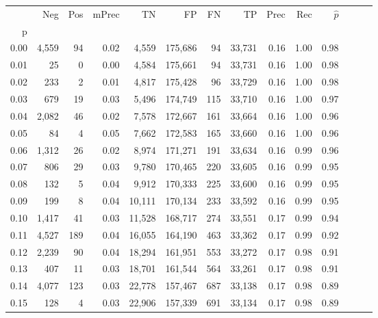 \begin{tabular}{rrrrrrrrrrrrrr}
\toprule
{} &     Neg &    Pos & mPrec &       TN &       FP &      FN &      TP &  Prec &   Rec & $\hat{p}$ \\
p    &         &        &       &          &          &         &         &       &       &           \\
\midrule
0.00 &   4,559 &     94 &  0.02 &    4,559 &  175,686 &      94 &  33,731 &  0.16 &  1.00 &      0.98 \\
0.01 &      25 &      0 &  0.00 &    4,584 &  175,661 &      94 &  33,731 &  0.16 &  1.00 &      0.98 \\
0.02 &     233 &      2 &  0.01 &    4,817 &  175,428 &      96 &  33,729 &  0.16 &  1.00 &      0.98 \\
0.03 &     679 &     19 &  0.03 &    5,496 &  174,749 &     115 &  33,710 &  0.16 &  1.00 &      0.97 \\
0.04 &   2,082 &     46 &  0.02 &    7,578 &  172,667 &     161 &  33,664 &  0.16 &  1.00 &      0.96 \\
0.05 &      84 &      4 &  0.05 &    7,662 &  172,583 &     165 &  33,660 &  0.16 &  1.00 &      0.96 \\
0.06 &   1,312 &     26 &  0.02 &    8,974 &  171,271 &     191 &  33,634 &  0.16 &  0.99 &      0.96 \\
0.07 &     806 &     29 &  0.03 &    9,780 &  170,465 &     220 &  33,605 &  0.16 &  0.99 &      0.95 \\
0.08 &     132 &      5 &  0.04 &    9,912 &  170,333 &     225 &  33,600 &  0.16 &  0.99 &      0.95 \\
0.09 &     199 &      8 &  0.04 &   10,111 &  170,134 &     233 &  33,592 &  0.16 &  0.99 &      0.95 \\
0.10 &   1,417 &     41 &  0.03 &   11,528 &  168,717 &     274 &  33,551 &  0.17 &  0.99 &      0.94 \\
0.11 &   4,527 &    189 &  0.04 &   16,055 &  164,190 &     463 &  33,362 &  0.17 &  0.99 &      0.92 \\
0.12 &   2,239 &     90 &  0.04 &   18,294 &  161,951 &     553 &  33,272 &  0.17 &  0.98 &      0.91 \\
0.13 &     407 &     11 &  0.03 &   18,701 &  161,544 &     564 &  33,261 &  0.17 &  0.98 &      0.91 \\
0.14 &   4,077 &    123 &  0.03 &   22,778 &  157,467 &     687 &  33,138 &  0.17 &  0.98 &      0.89 \\
0.15 &     128 &      4 &  0.03 &   22,906 &  157,339 &     691 &  33,134 &  0.17 &  0.98 &      0.89 \\

\end{tabular}
